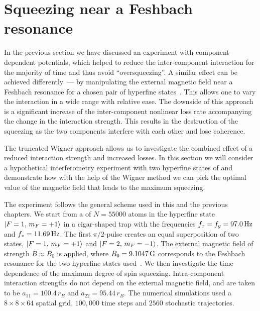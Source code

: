 \section{Squeezing near a Feshbach resonance}

In the previous section we have discussed an experiment with component-dependent potentials, which helped to reduce the inter-component interaction for the majority of time and thus avoid ``oversqueezing''.
A similar effect can be achieved differently~--- by manipulating the external magnetic field near a Feshbach resonance for a chosen pair of hyperfine states~\cite{Gross2010}.
This allows one to vary the interaction in a wide range with relative ease.
The downside of this approach is a significant increase of the inter-component nonlinear loss rate accompanying the change in the interaction strength.
This results in the destruction of the squeezing as the two components interfere with each other and lose coherence.

The truncated Wigner approach allows us to investigate the combined effect of a reduced interaction strength and increased losses.
In this section we will consider a hypothetical interferometry experiment with two hyperfine states of \Rb{} and demonstrate how with the help of the Wigner method we can pick the optimal value of the magnetic field that leads to the maximum squeezing.

The experiment follows the general scheme used in this and the previous chapters.
We start from a  of $N = 55000$ \Rb{} atoms in the hyperfine state ${\mbox{\ensuremath{\left\vert F=1,\, m_F=+1 \right\rangle}}}$ in a cigar-shaped trap with the frequencies $f_x = f_y = 97.0\mbox{\ensuremath{\,\mathrm{Hz}}}$ and $f_z = 11.69\mbox{\ensuremath{\,\mathrm{Hz}}}$.
The first $\pi/2$-pulse creates an equal superposition of two states, ${\mbox{\ensuremath{\left\vert F=1,\, m_F=+1 \right\rangle}}}$ and ${\mbox{\ensuremath{\left\vert F=2,\, m_F=-1 \right\rangle}}}$.
The external magnetic field of strength $B \approx B_0$ is applied, where $B_0 = 9.1047\mbox{\ensuremath{\,\mathrm{G}}}$ corresponds to the Feshbach resonance for the two hyperfine states used~\cite{Kaufman2009}.
We then investigate the time dependence of the maximum degree of spin squeezing.
Intra-component interaction strengths do not depend on the external magnetic field, and are taken to be $a_{11} = 100.4\,r_B$ and $a_{22} = 95.44\,r_B$.
The numerical simulations used a $8\times8\times64$ spatial grid, $100,000$ time steps and $2560$ stochastic trajectories.


